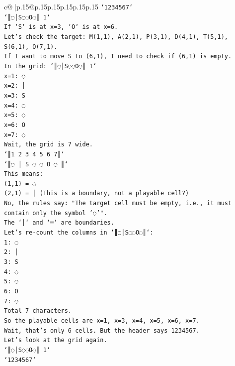 \documentclass{article}
\begin{document}
{\begin{supertabular}{c@{$\;$}|p{.15\linewidth}@{}p{.15\linewidth}p{.15\linewidth}p{.15\linewidth}p{.15\linewidth}p{.15\linewidth}}
{{{\texttt{`1234567`} \\
\texttt{`║◌│S◌◌O◌║ 1`} \\
\texttt{If `S` is at x=3, `O` is at x=6.} \\
\texttt{Let's check the target: M(1,1), A(2,1), P(3,1), D(4,1), T(5,1), S(6,1), O(7,1).} \\
\texttt{If I want to move S to (6,1), I need to check if (6,1) is empty.} \\
\texttt{In the grid: `║◌│S◌◌O◌║ 1`} \\
\texttt{x=1: ◌} \\
\texttt{x=2: │} \\
\texttt{x=3: S} \\
\texttt{x=4: ◌} \\
\texttt{x=5: ◌} \\
\texttt{x=6: O} \\
\texttt{x=7: ◌} \\
\texttt{Wait, the grid is 7 wide.} \\
\texttt{`║1 2 3 4 5 6 7║`} \\
\texttt{`║◌ │ S ◌ ◌ O ◌ ║`} \\
\texttt{This means:} \\
\texttt{(1,1) = ◌} \\
\texttt{(2,1) = │ (This is a boundary, not a playable cell?)} \\
\texttt{No, the rules say: "The target cell must be empty, i.e., it must contain only the symbol '◌'".} \\
\texttt{The `│` and `═` are boundaries.} \\
\texttt{Let's re{-}count the columns in `║◌│S◌◌O◌║`:} \\
\texttt{1: ◌} \\
\texttt{2: │} \\
\texttt{3: S} \\
\texttt{4: ◌} \\
\texttt{5: ◌} \\
\texttt{6: O} \\
\texttt{7: ◌} \\
\texttt{Total 7 characters.} \\
\texttt{So the playable cells are x=1, x=3, x=4, x=5, x=6, x=7.} \\
\texttt{Wait, that's only 6 cells. But the header says 1234567.} \\
\texttt{Let's look at the grid again.} \\
\texttt{`║◌│S◌◌O◌║ 1`} \\
\texttt{`1234567`} \\
}}}
\end{supertabular}}
\end{document}
